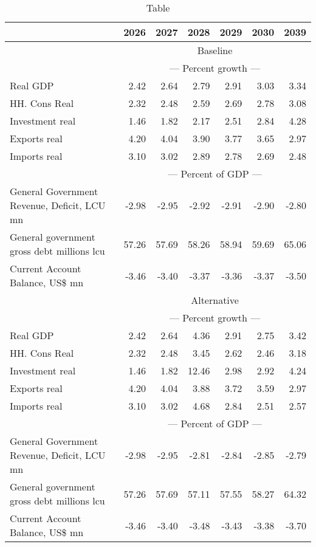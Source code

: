 \documentclass{article}
\begin{document}
\begin{table}[ht]
\caption*{Table}
\begin{tabular}{lrrrrr|r}
\toprule
 & 2026 & 2027 & 2028 & 2029 & 2030 & 2039 \\
\midrule
&\multicolumn{6}{c}{{Baseline}}                               \\
&\multicolumn{6}{c}{{--- Percent growth ---}}                               \\
Real GDP & 2.42 & 2.64 & 2.79 & 2.91 & 3.03 & 3.34 \\
HH. Cons Real & 2.32 & 2.48 & 2.59 & 2.69 & 2.78 & 3.08 \\
Investment real & 1.46 & 1.82 & 2.17 & 2.51 & 2.84 & 4.28 \\
Exports real & 4.20 & 4.04 & 3.90 & 3.77 & 3.65 & 2.97 \\
Imports real & 3.10 & 3.02 & 2.89 & 2.78 & 2.69 & 2.48 \\
&\multicolumn{6}{c}{{--- Percent of GDP ---}}                               \\
General Government Revenue, Deficit, LCU mn & -2.98 & -2.95 & -2.92 & -2.91 & -2.90 & -2.80 \\
General government gross debt millions lcu & 57.26 & 57.69 & 58.26 & 58.94 & 59.69 & 65.06 \\
Current Account Balance, US\$ mn & -3.46 & -3.40 & -3.37 & -3.36 & -3.37 & -3.50 \\
&\multicolumn{6}{c}{{Alternative}}                               \\
&\multicolumn{6}{c}{{--- Percent growth ---}}                               \\
Real GDP & 2.42 & 2.64 & 4.36 & 2.91 & 2.75 & 3.42 \\
HH. Cons Real & 2.32 & 2.48 & 3.45 & 2.62 & 2.46 & 3.18 \\
Investment real & 1.46 & 1.82 & 12.46 & 2.98 & 2.92 & 4.24 \\
Exports real & 4.20 & 4.04 & 3.88 & 3.72 & 3.59 & 2.97 \\
Imports real & 3.10 & 3.02 & 4.68 & 2.84 & 2.51 & 2.57 \\
&\multicolumn{6}{c}{{--- Percent of GDP ---}}                               \\
General Government Revenue, Deficit, LCU mn & -2.98 & -2.95 & -2.81 & -2.84 & -2.85 & -2.79 \\
General government gross debt millions lcu & 57.26 & 57.69 & 57.11 & 57.55 & 58.27 & 64.32 \\
Current Account Balance, US\$ mn & -3.46 & -3.40 & -3.48 & -3.43 & -3.38 & -3.70 \\

\end{tabular}
\end{table}
\end{document}
